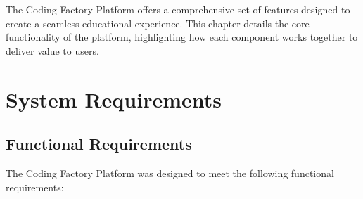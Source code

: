 \documentclass[12pt,a4paper]{report}
\begin{document}
The Coding Factory Platform offers a comprehensive set of features designed to create a seamless educational experience. This chapter details the core functionality of the platform, highlighting how each component works together to deliver value to users.

\section{System Requirements}

\subsection{Functional Requirements}

The Coding Factory Platform was designed to meet the following functional requirements:
\end{document}
